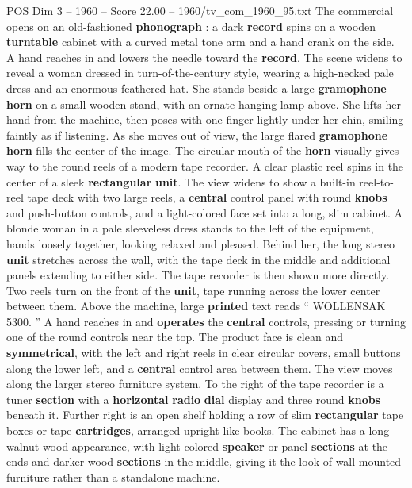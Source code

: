 \begin{textsample}{POS Dim 3 – 1960 – Score 22.00 – 1960/tv\_com\_1960\_95.txt}  \label{ex:f3_pos_023}
The commercial opens on an old-fashioned \textbf{phonograph} : a dark \textbf{record} spins on a wooden \textbf{turntable} cabinet with a curved metal tone arm and a hand crank on the side.
A hand reaches in and lowers the needle toward the \textbf{record}.
The scene widens to reveal a woman dressed in turn-of-the-century style, wearing a high-necked pale dress and an enormous feathered hat.
She stands beside a large \textbf{gramophone} \textbf{horn} on a small wooden stand, with an ornate hanging lamp above.
She lifts her hand from the machine, then poses with one finger lightly under her chin, smiling faintly as if listening.
As she moves out of view, the large flared \textbf{gramophone} \textbf{horn} fills the center of the image.
The circular mouth of the \textbf{horn} visually gives way to the round reels of a modern tape recorder.
A clear plastic reel spins in the center of a sleek \textbf{rectangular} \textbf{unit}.
The view widens to show a built-in reel-to-reel tape deck with two large reels, a \textbf{central} control panel with round \textbf{knobs} and push-button controls, and a light-colored face set into a long, slim cabinet.
A blonde woman in a pale sleeveless dress stands to the left of the equipment, hands loosely together, looking relaxed and pleased.
Behind her, the long stereo \textbf{unit} stretches across the wall, with the tape deck in the middle and additional panels extending to either side.
The tape recorder is then shown more directly.
Two reels turn on the front of the \textbf{unit}, tape running across the lower center between them.
Above the machine, large \textbf{printed} text reads “ WOLLENSAK 5300. ” A hand reaches in and \textbf{operates} the \textbf{central} controls, pressing or turning one of the round controls near the top.
The product face is clean and \textbf{symmetrical}, with the left and right reels in clear circular covers, small buttons along the lower left, and a \textbf{central} control area between them.
The view moves along the larger stereo furniture system.
To the right of the tape recorder is a tuner \textbf{section} with a \textbf{horizontal} \textbf{radio} \textbf{dial} display and three round \textbf{knobs} beneath it.
Further right is an open shelf holding a row of slim \textbf{rectangular} tape boxes or tape \textbf{cartridges}, arranged upright like books.
The cabinet has a long walnut-wood appearance, with light-colored \textbf{speaker} or panel \textbf{sections} at the ends and darker wood \textbf{sections} in the middle, giving it the look of wall-mounted furniture rather than a standalone machine.

\end{textsample}
